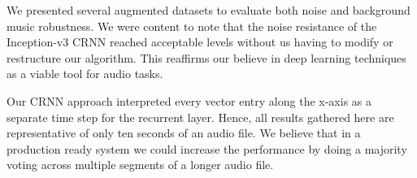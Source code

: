 We presented several augmented datasets to evaluate both noise and background music robustness. We were content to note that the noise resistance of the Inception-v3 CRNN reached acceptable levels without us having to modify or restructure our algorithm. This reaffirms our believe in deep learning techniques as a viable tool for audio tasks.

Our CRNN approach interpreted every vector entry along the x-axis as a separate time step for the recurrent layer. Hence, all results gathered here are representative of only ten seconds of an audio file. We believe that in a production ready system we could increase the performance by doing a majority voting across multiple segments of a longer audio file.


